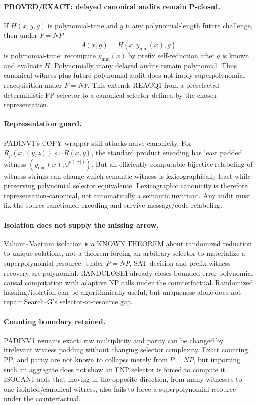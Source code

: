 \documentclass[11pt]{article}
\begin{document}
\paragraph{PROVED/EXACT: delayed canonical audits remain P-closed.} If $H(x,y,g)$ is polynomial-time and $g$ is any polynomial-length future challenge, then under $P=NP$
\[A(x,g)=H(x,y_{\min}(x),g)\]
is polynomial-time: recompute $y_{\min}(x)$ by prefix self-reduction after $g$ is known and evaluate $H$. Polynomially many delayed audits remain polynomial. Thus canonical witness plus future polynomial audit does not imply superpolynomial reacquisition under $P=NP$. This extends REACQ1 from a preselected deterministic FP selector to a canonical selector defined by the chosen representation.

\paragraph{Representation guard.} PADINV1's COPY wrapper still attacks naive canonicity. For $R_p(x,(y,z))\iff R(x,y)$, the standard product encoding has least padded witness $(y_{\min}(x),0^{p(|x|)})$. But an efficiently computable bijective relabeling of witness strings can change which semantic witness is lexicographically least while preserving polynomial selector equivalence. Lexicographic canonicity is therefore representation-canonical, not automatically a semantic invariant. Any audit must fix the source-sanctioned encoding and survive message/code relabeling.

\paragraph{Isolation does not supply the missing arrow.} Valiant--Vazirani isolation is a KNOWN THEOREM about randomized reduction to unique solutions, not a theorem forcing an arbitrary selector to materialize a superpolynomial resource. Under $P=NP$, SAT decision and prefix witness recovery are polynomial. RANDCLOSE1 already closes bounded-error polynomial causal computation with adaptive NP calls under the counterfactual. Randomized hashing/isolation can be algorithmically useful, but uniqueness alone does not repair Search--G's selector-to-resource gap.

\paragraph{Counting boundary retained.} PADINV1 remains exact: raw multiplicity and parity can be changed by irrelevant witness padding without changing selector complexity. Exact counting, PP, and parity are not known to collapse merely from $P=NP$, but importing such an aggregate does not show an FNP selector is forced to compute it. ISOCAN1 adds that moving in the opposite direction, from many witnesses to one isolated/canonical witness, also fails to force a superpolynomial resource under the counterfactual.
\end{document}
